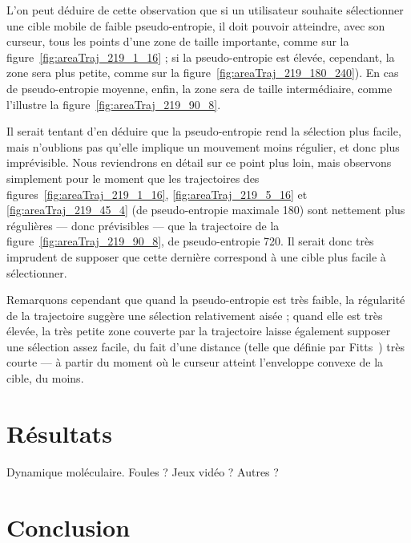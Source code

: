 	L'on peut déduire de cette observation que si un utilisateur souhaite sélectionner une cible mobile de faible pseudo-entropie, il doit pouvoir atteindre, avec son curseur, tous les points d'une zone de taille importante, comme sur la figure~\ref{fig:areaTraj_219_1_16} ; si la pseudo-entropie est élevée, cependant, la zone sera plus petite, comme sur la figure~\ref{fig:areaTraj_219_180_240}). En cas de pseudo-entropie moyenne, enfin, la zone sera de taille intermédiaire, comme l'illustre la figure~\ref{fig:areaTraj_219_90_8}.
	
	Il serait tentant d'en déduire que la pseudo-entropie rend la sélection plus facile, mais n'oublions pas qu'elle implique un mouvement moins régulier, et donc plus imprévisible. Nous reviendrons en détail sur ce point plus loin, mais observons simplement pour le moment que les trajectoires des figures~\ref{fig:areaTraj_219_1_16}, \ref{fig:areaTraj_219_5_16} et \ref{fig:areaTraj_219_45_4} (de pseudo-entropie maximale 180) sont nettement plus régulières --- donc prévisibles --- que la trajectoire de la figure~\ref{fig:areaTraj_219_90_8}, de pseudo-entropie 720. Il serait donc très imprudent de supposer que cette dernière correspond à une cible plus facile à sélectionner.
	
	Remarquons cependant que quand la pseudo-entropie est très faible, la régularité de la trajectoire suggère une sélection relativement aisée ; quand elle est très élevée, la très petite zone couverte par la trajectoire laisse également supposer une sélection assez facile, du fait d'une distance (telle que définie par Fitts~\cite{fitts1954information}) très courte --- à partir du moment où le curseur atteint l'enveloppe convexe de la cible, du moins.
	
\section{Résultats}
	Dynamique moléculaire. Foules ? Jeux vidéo ? Autres ?


\section{Conclusion}

\clearpage
